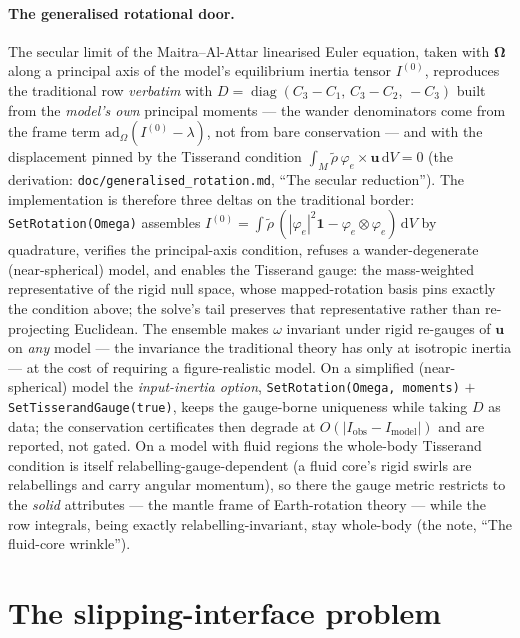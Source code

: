 \documentclass[11pt]{article}
\numberwithin{equation}{section}
\theoremstyle{remark}
\newcommand{\dV}{\,\mathrm{d}V}
\newcommand{\vu}{\mathbf{u}}
\newcommand{\code}[1]{\texttt{#1}}
\begin{document}
\paragraph{The generalised rotational door.}\label{sec:rotation-door} The secular limit of the
Maitra--Al-Attar linearised Euler equation, taken with $\bm{\Omega}$ along
a principal axis of the model's equilibrium inertia tensor
$I^{(0)}$, reproduces the traditional row \emph{verbatim} with
$D = \operatorname{diag}(C_3-C_1,\, C_3-C_2,\, -C_3)$ built from the \emph{model's
own} principal moments --- the wander denominators come from the frame
term $\mathrm{ad}_\Omega(I^{(0)}-\lambda)$, not from bare conservation
--- and with the displacement pinned by the Tisserand condition
$\int_M \tilde\rho\,\varphi_e\times\vu\dV = 0$ (the derivation:
\code{doc/generalised\_rotation.md}, ``The secular
reduction''). The implementation is therefore three deltas on the
traditional border: \code{SetRotation(Omega)} assembles
$I^{(0)} = \int\tilde\rho\,(|\varphi_e|^2\mathbf{1} -
\varphi_e\otimes\varphi_e)\dV$ by quadrature, verifies the
principal-axis condition, refuses a wander-degenerate (near-spherical)
model, and enables the Tisserand gauge: the mass-weighted
representative of the rigid null space, whose mapped-rotation basis
pins exactly the condition above; the solve's tail preserves that
representative rather than re-projecting Euclidean. The ensemble makes
$\omega$ invariant under rigid re-gauges of $\vu$ on \emph{any} model
--- the invariance the traditional theory has only at isotropic inertia
--- at the cost of requiring a figure-realistic model. On a simplified
(near-spherical) model the \emph{input-inertia option},
\code{SetRotation(Omega, moments)} $+$ \code{SetTisserandGauge(true)},
keeps the gauge-borne uniqueness while taking $D$ as data; the
conservation certificates then degrade at $O(|I_{\mathrm{obs}} -
I_{\mathrm{model}}|)$ and are reported, not gated. On a model with
fluid regions the whole-body Tisserand condition is itself
relabelling-gauge-dependent (a fluid core's rigid swirls are
relabellings and carry angular momentum), so there the gauge metric
restricts to the \emph{solid} attributes --- the mantle frame of
Earth-rotation theory --- while the row integrals, being exactly
relabelling-invariant, stay whole-body (the note, ``The fluid-core
wrinkle'').

\section{The slipping-interface problem}
\label{sec:slip}
\end{document}
